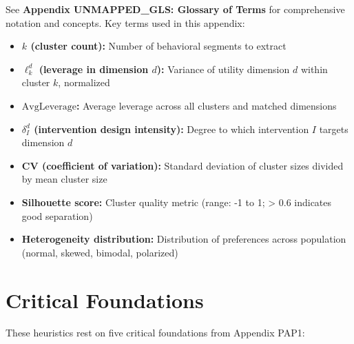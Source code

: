 See \textbf{Appendix UNMAPPED_GLS: Glossary of Terms} for comprehensive notation and concepts. Key terms used in this appendix:

\begin{itemize}[nosep]
\item \textbf{$k$ (cluster count):} Number of behavioral segments to extract
\item \textbf{$\ell_k^d$ (leverage in dimension $d$):} Variance of utility dimension $d$ within cluster $k$, normalized
\item \textbf{$\text{AvgLeverage}$:} Average leverage across all clusters and matched dimensions
\item \textbf{$\delta_I^d$ (intervention design intensity):} Degree to which intervention $I$ targets dimension $d$
\item \textbf{CV (coefficient of variation):} Standard deviation of cluster sizes divided by mean cluster size
\item \textbf{Silhouette score:} Cluster quality metric (range: -1 to 1; > 0.6 indicates good separation)
\item \textbf{Heterogeneity distribution:} Distribution of preferences across population (normal, skewed, bimodal, polarized)
\end{itemize}


\section{Critical Foundations}
\label{sec:h-foundations}

These heuristics rest on five critical foundations from Appendix PAP1:

